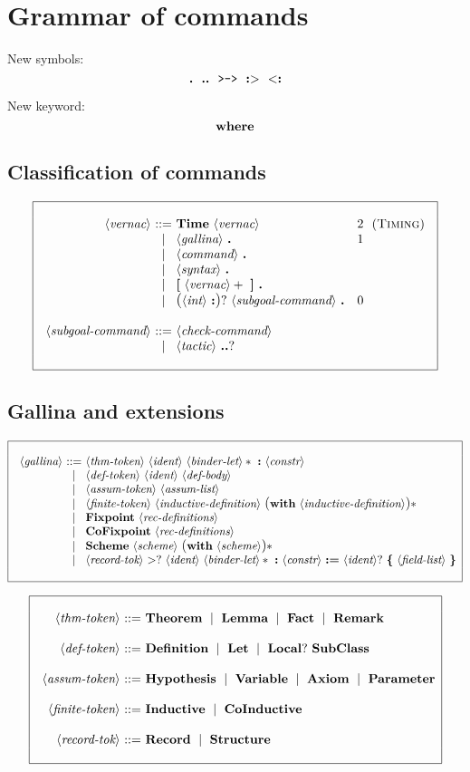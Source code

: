 \documentclass{article}
\makeatletter
\def\GR#1{\text{\large(}#1\text{\large)}}
\def\NT#1{\langle\textit{#1}\rangle}
\def\TERM#1{{\bf\textrm{\bf #1}}}
\def\KWD#1{\TERM{#1}}
\def\STAR#1{#1*}
\def\STARGR#1{\GR{#1}*}
\def\PLUS#1{#1+}
\def\OPT#1{#1?}
\def\OPTGR#1{\GR{#1}?}
\newenvironment{cadre}
        {\begin{array}{|c|}\hline\\}
        {\\\\\hline\end{array}}
\newenvironment{rulebox}
        {$$\begin{cadre}\begin{array}{r@{~}c@{~}l@{}l@{}r}}
        {\end{array}\end{cadre}$$}
\def\DEFNT#1{\NT{#1} & ::= &}
\def\RNAME#1{(\textsc{#1})}
\def\SEPDEF{\\\\}
\def\nlsep{\\&|&}
\newenvironment{rules}
        {\begin{center}\begin{rulebox}}
        {\end{rulebox}\end{center}}
\makeatother
\begin{document}
\section{Grammar of commands}

New symbols:
$$ \TERM{.}
~~ \TERM{..}
~~ \TERM{\tt >->}
~~ \TERM{:$>$}
~~ \TERM{$<$:}
$$

New keyword:
$$ \KWD{where}
$$

\subsection{Classification of commands}

\begin{rules}
\DEFNT{vernac}
       \TERM{Time}~\NT{vernac}  &2~~ &\RNAME{Timing}
\nlsep \NT{gallina}~\TERM{.}    &1
\nlsep \NT{command}~\TERM{.}
\nlsep \NT{syntax}~\TERM{.}
\nlsep \TERM{[}~\PLUS{\NT{vernac}}~\TERM{]}~\TERM{.}
\nlsep \OPTGR{\NT{int}~\KWD{:}}~\NT{subgoal-command}~\TERM{.} ~~~&0
\SEPDEF
\DEFNT{subgoal-command}
       \NT{check-command}
\nlsep %
   \NT{tactic}~\OPT{\KWD{..}}
\end{rules}

\subsection{Gallina and extensions}

\begin{rules}
\DEFNT{gallina}
       \NT{thm-token}~\NT{ident}~\STAR{\NT{binder-let}}~\KWD{:}~\NT{constr}
\nlsep \NT{def-token}~\NT{ident}~\NT{def-body}
\nlsep \NT{assum-token}~\NT{assum-list}
\nlsep \NT{finite-token}~\NT{inductive-definition}
      ~\STARGR{\KWD{with}~\NT{inductive-definition}}
\nlsep \TERM{Fixpoint}~\NT{rec-definitions}
\nlsep \TERM{CoFixpoint}~\NT{rec-definitions}
\nlsep \TERM{Scheme}~\NT{scheme}~\STARGR{\KWD{with}~\NT{scheme}}
\nlsep \NT{record-tok}~\OPT{\TERM{$>$}}~\NT{ident}~\STAR{\NT{binder-let}}
       ~\KWD{:}~\NT{constr}~\KWD{:=}
       ~\OPT{\NT{ident}}~\KWD{\{}~\NT{field-list}~\KWD{\}}
\end{rules}

\begin{rules}
\DEFNT{thm-token}
   \TERM{Theorem} ~\mid~ \TERM{Lemma} ~\mid~ \TERM{Fact} ~\mid~ \TERM{Remark}
\SEPDEF
\DEFNT{def-token}
   \TERM{Definition} ~\mid~ \TERM{Let} ~\mid~
   \OPT{\TERM{Local}}~\TERM{SubClass}
\SEPDEF
\DEFNT{assum-token}
    \TERM{Hypothesis} ~\mid~ \TERM{Variable} ~\mid~ \TERM{Axiom} ~\mid~
    \TERM{Parameter}
\SEPDEF
\DEFNT{finite-token}
    \TERM{Inductive} ~\mid~ \TERM{CoInductive}
\SEPDEF
\DEFNT{record-tok}
    \TERM{Record} ~\mid~ \TERM{Structure}
\end{rules}
\end{document}
